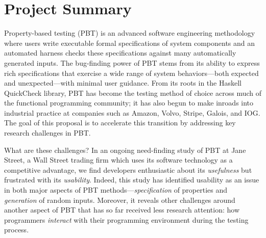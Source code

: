 \section*{Project Summary}


\newcommand{\summarysection}[1]{\medskip \noindent {\bf #1.}}

\summarysection{Overview}
Property-based testing (PBT) is an advanced software engineering
methodology where users write executable formal specifications of system
components
and an automated harness checks these specifications against
many automatically generated inputs.  The bug-finding power of PBT
stems from its ability to express rich specifications that
exercise a wide range of system behaviors---both
expected and unexpected---with minimal user guidance.
%
From its roots in the Haskell QuickCheck library, PBT has become
the testing method of choice across much of the functional programming
community; it has also begun to make inroads into industrial practice
at companies such as Amazon, Volvo, Stripe, Galois, and IOG.
%
The goal of this proposal is to accelerate this transition
by addressing key research challenges in
PBT.

What are these challenges?
In an ongoing need-finding study of PBT at Jane
Street, a Wall Street trading firm which uses its software
technology as a competitive advantage, we find developers enthusiastic
about its {\em usefulness} but frustrated with its {\em usability}.
%
Indeed, this study has identified usability as an issue in both major aspects
of PBT methods---{\em specification} of properties and {\em
  generation} of random inputs. Moreover, it reveals other challenges
around another aspect of PBT that has so far received less research
attention: how programmers {\em interact} with their programming
environment during the testing process.


